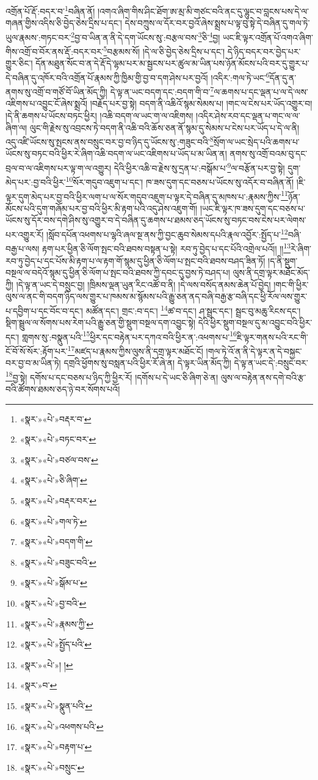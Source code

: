 འགྲོན་པོ་རྡོ་:བདར་བ་\footnote{«སྣར་»«པེ་»བརྡར་བ་}བཞིན་ནོ། །འགའ་ཞིག་གིས་ཤིང་ཐོག་ཨ་མྲ་མི་གཙང་བའི་ནང་དུ་ལྷུང་བ་བླངས་པས་དེ་ལ་གཞན་གྱིས་འདིས་ཅི་བྱེད་ཅེས་དྲིས་པ་དང་། དེས་བཀྲུས་ལ་དོར་བར་བྱའོ་ཞེས་སྨྲས་པ་ལྟ་བུ་སྟེ་དེ་བཞིན་དུ་གལ་ཏེ་ཡུལ་རྣམས་:གཏང་བར་\footnote{«སྣར་»«པེ་»བཏང་བར་}བྱ་བ་ཡིན་ན་ནི་དེ་དག་ཡོངས་སུ་:བརྩལ་བས་\footnote{«སྣར་»«པེ་»བཙལ་བས་}ཅི་\footnote{«སྣར་»«པེ་»ཅི་ཞིག་}བྱ། ཡང་ཇི་ལྟར་འགྲོན་པོ་འགའ་ཞིག་གིས་འགྲོ་བ་བོར་ནས་རྡོ་:བདར་བར་\footnote{«སྣར་»«པེ་»བརྡར་བར་}བརྩམས་སོ། །དེ་ལ་ཅི་བྱེད་ཅེས་དྲིས་པ་དང་། དེ་ཉིད་བདར་བར་བྱེད་པར་གྱུར་ཅིང་། དོན་མཐུན་སོང་བ་ན་དེ་རྡོ་དེ་ལྷམ་པར་མ་སྦྱངས་པར་ཚུལ་མ་ཡིན་པས་ཉོན་མོངས་པའི་བར་དུ་གྱུར་པ་དེ་བཞིན་དུ་འཁོར་བའི་འགྲོན་པོ་རྣམས་ཀྱི་ཁྱིམ་གྱི་བྱ་བ་དག་ཤེས་པར་བྱའོ། །འདིར་:གལ་ཏེ་ཡང་\footnote{«སྣར་»«པེ་»གལ་ཏེ་}དོན་དུ་ན་ནགས་སུ་འགྲོ་བ་གཙོ་བོ་ཡིན་མོད་ཀྱི། དེ་ལྟ་ན་ཡང་བདག་དང་:བདག་གི་བ་\footnote{«སྣར་»«པེ་»བདག་གི་}ལ་ཆགས་པ་དང་ལྡན་པ་ལ་དེ་ལས་འཇིགས་པ་འབྱུང་ངོ་ཞེས་སྨྲའོ། །བརྗོད་པར་བྱ་སྟེ། བདག་ནི་འཆིའོ་སྙམ་སེམས་པ། །གང་ལ་ངེས་པར་ཡོད་འགྱུར་བ། །དེ་ནི་ཆགས་པ་ཡོངས་བཏང་ཕྱིར། །འཆི་བདག་ལ་ཡང་ག་ལ་འཇིགས། །འདིར་ཤེས་རབ་དང་ལྡན་པ་གང་ལ་ལ་ཞིག་ལ། ལུང་གི་རྗེས་སུ་འབྲངས་ཏེ་བདག་ནི་འཆི་བའི་ཆོས་ཅན་ནོ་སྙམ་དུ་སེམས་པ་ངེས་པར་ཡོད་པ་དེ་ལ་ནི། འདུ་འཛི་ཡོངས་སུ་སྤངས་ནས་བསྲུང་བར་བྱ་བ་ཉིད་དུ་ཡོངས་སུ་:གཟུང་བའི་\footnote{«སྣར་»«པེ་»བཟུང་བའི་}སྲོག་ལ་ཡང་སྲེད་པའི་ཆགས་པ་ཡོངས་སུ་བཏང་བའི་ཕྱིར་རེ་ཞིག་འཆི་བདག་ལ་ཡང་འཇིགས་པ་ཡོད་པ་མ་ཡིན་ན། ནགས་སུ་འགྲོ་བའམ་བུ་དང་བྲལ་བ་ལ་འཇིགས་པར་ལྟ་ག་ལ་འགྱུར། དེའི་ཕྱིར་འཆི་བ་རྗེས་སུ་དྲན་པ་:བསྒོམ་པ་\footnote{«སྣར་»«པེ་»སྒོམ་པ་}ལ་བརྩོན་པར་བྱ་སྟེ། དུག་མེད་པར་:བྱ་བའི་ཕྱིར་\footnote{«སྣར་»«པེ་»བྱ་བའི་}སོར་གདུབ་འཇུག་པ་དང་། ཁ་ཟས་དུག་དང་བཅས་པ་ཡོངས་སུ་འདོར་བ་བཞིན་ནོ། །ཇི་ལྟར་དུག་མེད་པར་བྱ་བའི་ཕྱིར་ལག་པ་ལ་སོར་གདུབ་འཇུག་པ་ལྟར་དེ་བཞིན་དུ་མཁས་པ་:རྣམས་ཀྱིས་\footnote{«སྣར་»«པེ་»རྣམས་ཀྱི་}ཉོན་མོངས་པའི་དུག་གཞོམ་པར་བྱ་བའི་ཕྱིར་མི་རྟག་པའི་འདུ་ཤེས་འཇུག་གོ། །ཡང་ཇི་ལྟར་ཁ་ཟས་དུག་དང་བཅས་པ་ཡོངས་སུ་དོར་བས་དགེ་ཤིས་སུ་འགྱུར་བ་དེ་བཞིན་དུ་ཆགས་པ་ཐམས་ཅད་ཡོངས་སུ་བཏང་བས་ངེས་པར་ལེགས་པར་འགྱུར་རོ། །སློབ་དཔོན་འཕགས་པ་ལྷའི་ཞལ་སྔ་ནས་ཀྱི་བྱང་ཆུབ་སེམས་དཔའི་རྣལ་འབྱོར་:སྤྱོད་པ་\footnote{«སྣར་»«པེ་»སྤྱོད་པའི་}བཞི་བརྒྱ་པ་ལས། རྟག་པར་ཕྱིན་ཅི་ལོག་སྤང་བའི་ཐབས་བསྟན་པ་སྟེ། རབ་ཏུ་བྱེད་པ་དང་པོའི་འགྲེལ་པའོ།། །།\footnote{«སྣར་»«པེ་»། །}རེ་ཞིག་རབ་ཏུ་བྱེད་པ་དང་པོས་མི་རྟག་པ་ལ་རྟག་གོ་སྙམ་དུ་ཕྱིན་ཅི་ལོག་པ་སྤང་བའི་ཐབས་བཤད་ཟིན་ཏོ། །ད་ནི་སྡུག་བསྔལ་ལ་བདེའོ་སྙམ་དུ་ཕྱིན་ཅི་ལོག་པ་སྤང་བའི་ཐབས་ཀྱི་དབང་དུ་བྱས་ཏེ་བཤད་པ། ལུས་ནི་དགྲ་ལྟར་མཐོང་མོད་ཀྱི། །དེ་ལྟ་ན་ཡང་དེ་བསྲུང་བྱ། །ཁྲིམས་ལྡན་ཡུན་རིང་འཚོ་བ་ནི། །དེ་ལས་བསོད་ནམས་ཆེན་པོ་བྱེད། །གང་གི་ཕྱིར་ལུས་ལ་ནང་གི་བདག་ཉིད་ལས་གྱུར་པ་ཁམས་མ་སྙོམས་པའི་རྒྱུ་ཅན་ནད་བཞི་བརྒྱ་རྩ་བཞི་དང་ཕྱི་རོལ་ལས་གྱུར་པ་དབྱིག་པ་དང་བོང་བ་དང་། མཚོན་དང་། གྲང་:བ་དང་། \footnote{«སྣར་»བ་}ཚ་བ་དང་། ཤ་སྦྲང་དང་། སྦྲང་བུ་མཆུ་རིངས་དང་། སྡིག་སྦྲུལ་ལ་སོགས་པས་རེག་པའི་རྒྱུ་ཅན་གྱི་སྡུག་བསྔལ་དག་འབྱུང་སྟེ། དེའི་ཕྱིར་སྡུག་བསྔལ་དུ་མ་འབྱུང་བའི་ཕྱིར་དང་། གླགས་སུ་:བསྣུན་པའི་\footnote{«སྣར་»«པེ་»སྣུན་པའི་}ཕྱིར་དང་བརྟེན་པར་དཀའ་བའི་ཕྱིར་ན་:འཕགས་པ་\footnote{«སྣར་»«པེ་»འཕགས་པའི་}ཇི་ལྟར་གནས་པའི་རང་གི་ངོ་བོ་སོ་སོར་:རྟོག་པར་\footnote{«སྣར་»«པེ་»བརྟག་པ་}མཛད་པ་རྣམས་ཀྱིས་ལུས་ནི་དགྲ་ལྟར་མཐོང་ངོ། །གལ་ཏེ་འོ་ན་ནི་དེ་ལྟར་ན་དེ་བསྐྱང་བར་བྱ་བ་མ་ཡིན་ཏེ། དགྲའི་ཕྱོགས་སུ་བསླན་པའི་ཕྱིར་རོ་ཞེ་ན། དེ་ལྟར་ཡིན་མོད་ཀྱི། དེ་ལྟ་ན་ཡང་དེ་:བསྲུང་བར་\footnote{«སྣར་»«པེ་»བསྲུང་}བྱ་སྟེ། དགོས་པ་དང་བཅས་པ་ཉིད་ཀྱི་ཕྱིར་རོ། །དགོས་པ་དེ་ཡང་ཅི་ཞིག་ཅེ་ན། ལུས་ལ་བརྟེན་ནས་དགེ་བའི་རྩ་བའི་ཚོགས་ཐམས་ཅད་ཉེ་བར་སོགས་པའོ། 